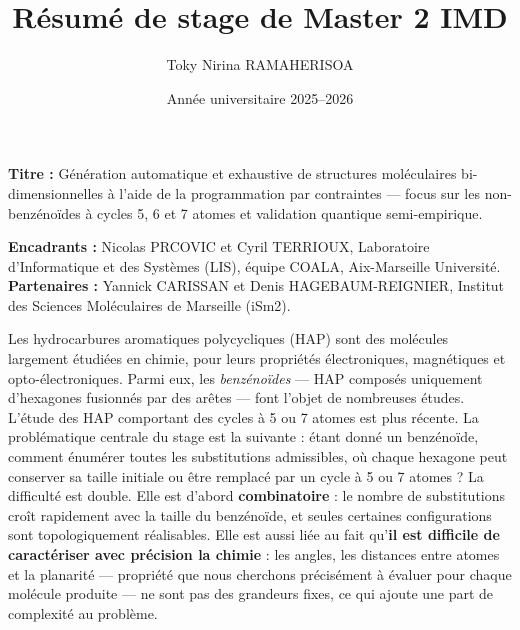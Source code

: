 \documentclass[11pt,a4paper]{article}
\title{\vspace{-2em}Résumé de stage de Master 2 IMD}
\author{Toky Nirina RAMAHERISOA}
\date{Année universitaire 2025--2026}
\begin{document}
\maketitle
\vspace{-1.5em}

\noindent\textbf{Titre :} Génération automatique et exhaustive de
structures moléculaires bi-dimensionnelles à l'aide de la programmation
par contraintes --- focus sur les non-benzénoïdes à cycles 5, 6 et 7
atomes et validation quantique semi-empirique.

\smallskip

\noindent\textbf{Encadrants :} Nicolas PRCOVIC et Cyril TERRIOUX,
Laboratoire d'Informatique et des Systèmes (LIS), équipe COALA, Aix-Marseille
Université. \\
\noindent\textbf{Partenaires :} Yannick CARISSAN et Denis
HAGEBAUM-REIGNIER, Institut des Sciences Moléculaires de Marseille (iSm2).

\bigskip

Les hydrocarbures aromatiques polycycliques (HAP) sont des molécules
largement étudiées en chimie, pour leurs propriétés électroniques,
magnétiques et opto-électroniques. Parmi eux, les \emph{benzénoïdes}
--- HAP composés uniquement d'hexagones fusionnés par des arêtes ---
font l'objet de nombreuses études. L'étude des HAP comportant des
cycles à 5 ou 7 atomes est plus récente. La problématique centrale du
stage est la suivante : étant donné un benzénoïde, comment énumérer
toutes les substitutions admissibles, où chaque hexagone peut conserver
sa taille initiale ou être remplacé par un cycle à 5 ou 7 atomes ? La
difficulté est double. Elle est d'abord \textbf{combinatoire} : le
nombre de substitutions croît rapidement avec la taille du benzénoïde,
et seules certaines configurations sont topologiquement réalisables.
Elle est aussi liée au fait qu'\textbf{il est difficile de caractériser
avec précision la chimie} : les angles, les distances entre atomes et
la planarité --- propriété que nous cherchons précisément à évaluer
pour chaque molécule produite --- ne sont pas des grandeurs fixes, ce
qui ajoute une part de complexité au problème.
\end{document}
